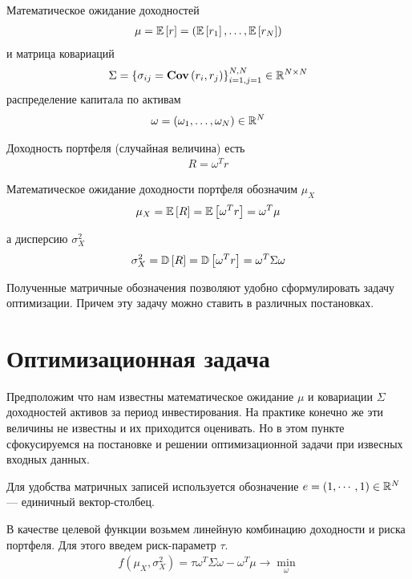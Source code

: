 Математическое ожидание доходностей
\begin{align}
	\mu = \mathbb{E}\left[r\right] = \left(\mathbb{E}\left[r_1\right], \dots, \mathbb{E}\left[r_N\right]\right)	
\end{align}
и матрица ковариаций
\begin{align}
	\Sigma = \left\{\sigma_{ij} = \textbf{Cov}\left(r_i, r_j\right)\right\}_{i=1, j=1}^{N, N} \in \mathbb{R}^{N \times N}
\end{align}
распределение капитала по активам
\begin{align}
	\omega = \left(\omega_1, \dots, \omega_N \right) \in \mathbb{R}^N
\end{align}

Доходность портфеля (случайная величина) есть
\begin{align}
	R = \omega^T r
\end{align}

Математическое ожидание доходности портфеля обозначим $\mu_X$
\begin{align}
	\mu_X = \mathbb{E}\left[R\right] = \mathbb{E}\left[\omega^T r\right] = \omega^T \mu
\end{align}

а дисперсию $\sigma_X^2$
\begin{align}
	\sigma_X^2 = \mathbb{D}\left[R\right] = \mathbb{D}\left[\omega^T r\right] = \omega^T \Sigma \omega
\end{align}

Полученные матричные обозначения позволяют удобно сформулировать задачу оптимизации.
Причем эту задачу можно ставить в различных постановках.

\section{Оптимизационная задача}

Предположим что нам известны математическое ожидание $\mu$ и ковариации $\Sigma$ доходностей активов за период инвестирования.
На практике конечно же эти величины не известны и их приходится оценивать. Но в этом пункте сфокусируемся
на постановке и решении оптимизационной задачи при извесных входных данных.

Для удобства матричных записей используется обозначение $e = (1, \cdots, 1) \in \mathbb{R}^N$ --- единичный вектор-столбец.


В качестве целевой функции возьмем линейную комбинацию доходности и риска портфеля. Для этого введем риск-параметр $\tau$.
\begin{align}
	f\left(\mu_X, \sigma_X^2 \right) = \tau \omega^T \Sigma \omega - \omega^T \mu \rightarrow \min_{\omega}
\end{align}

